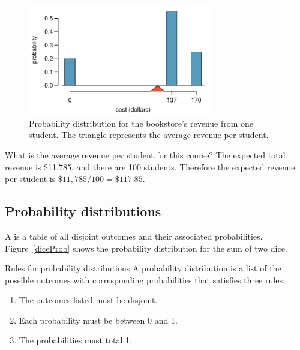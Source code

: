 \begin{figure}[hhh]
\centering
\includegraphics[width=0.72\textwidth]{ch_probability/figures/bookCostDist/bookCostDist}
\caption{Probability distribution for the bookstore's revenue from one student.   The triangle represents the average revenue per student.}
\label{bookCostDist}
\end{figure}

\begin{examplewrap}
\begin{nexample}{What is the average revenue per student for this course?}\label{revFromStudent}
The expected total revenue is \$11,785, and there are 100 students. Therefore the expected revenue per student is $\$11,785/100 =  \$117.85$.
\end{nexample}
\end{examplewrap}


\subsection{Probability distributions}

A  is a table of all disjoint outcomes and their associated probabilities. Figure~\ref{diceProb} shows the probability distribution for the sum of two dice.

\begin{onebox}{Rules for probability distributions}
A probability distribution is a list of the possible outcomes with corresponding probabilities that satisfies three rules: \vspace{-2mm}
\begin{enumerate}
\setlength{\itemsep}{0mm}
\item The outcomes listed must be disjoint.
\item Each probability must be between 0 and 1.
\item The probabilities must total 1. \vspace{1mm}
\end{enumerate}\end{onebox}

